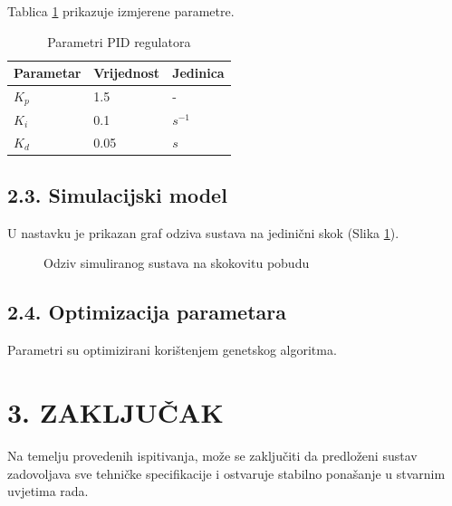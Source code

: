 \documentclass[12pt,a4paper]{article}
\begin{document}
Tablica \ref{tab:rezultati} prikazuje izmjerene parametre.
\begin{table}[h]
    \centering
    \caption{Parametri PID regulatora}
    \label{tab:rezultati}
    \begin{tabularx}{0.8\textwidth}{|X|X|X|}
        \hline
        \textbf{Parametar} & \textbf{Vrijednost} & \textbf{Jedinica} \\ \hline
        $K_p$ & 1.5 & - \\ \hline
        $K_i$ & 0.1 & $s^{-1}$ \\ \hline
        $K_d$ & 0.05 & $s$ \\ \hline
    \end{tabularx}
\end{table}

\subsection{2.3. Simulacijski model}
U nastavku je prikazan graf odziva sustava na jedinični skok (Slika \ref{fig:graf}).

\begin{figure}[h]
    \centering
    \caption{Odziv simuliranog sustava na skokovitu pobudu}
    \label{fig:graf}
\end{figure}

\subsection{2.4. Optimizacija parametara}
Parametri su optimizirani korištenjem genetskog algoritma.

\section{3. ZAKLJUČAK}
Na temelju provedenih ispitivanja, može se zaključiti da predloženi sustav zadovoljava sve tehničke specifikacije i ostvaruje stabilno ponašanje u stvarnim uvjetima rada.
\end{document}
